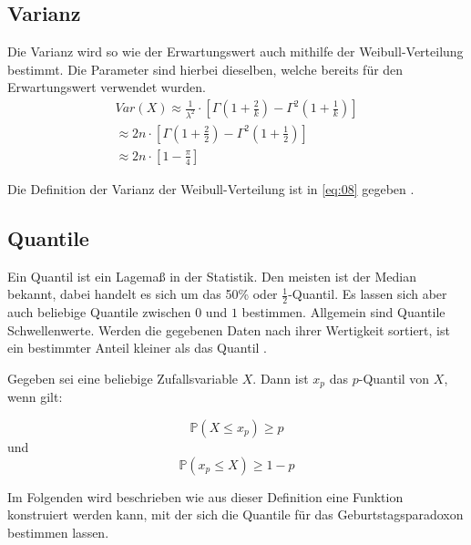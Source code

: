 \documentclass[../main.tex]{subfiles}
\begin{document}
\begin{flushleft}
        \subsection{Varianz}

        Die Varianz wird so wie der Erwartungswert auch mithilfe der Weibull-Verteilung bestimmt. Die Parameter sind hierbei dieselben, welche bereits für den Erwartungswert verwendet wurden\cite{rinne}.
        \begin{eqnarray}
            Var(X) \approx \frac{ 1 }{ \lambda^{ 2 } } \cdot [\Gamma (1+\frac{ 2 }{ k }) - \Gamma^{ 2 }(1+\frac{ 1 }{ k } )]   \label{eq:08}\\
            \approx 2n \cdot [\Gamma(1+\frac{ 2 }{ 2 }) - \Gamma^{ 2 }(1+\frac{ 1 }{ 2 } )] \\
            \approx 2n \cdot [1 - \frac{ \pi }{ 4 }]
        \end{eqnarray}

        Die Definition der Varianz der Weibull-Verteilung ist in \ref{eq:08} gegeben \cite{rinne}.

        \subsection{Quantile}\label{subsec:quantile}

        Ein Quantil ist ein Lagemaß in der Statistik. Den meisten ist der Median bekannt, dabei handelt es sich um das 50\% oder $\frac{1}{2}$-Quantil. Es lassen sich aber auch beliebige Quantile zwischen $0$ und $1$ bestimmen. Allgemein sind Quantile Schwellenwerte. Werden die gegebenen Daten nach ihrer Wertigkeit sortiert, ist ein bestimmter Anteil kleiner als das Quantil \cite[32,35,37]{henze}. \newline

        Gegeben sei eine beliebige Zufallsvariable $X$. Dann ist $x_{p}$ das $p$-Quantil von $X$, wenn gilt:

        \begin{equation}
            \mathbb{P}(X \leq x_p) \geq p
        \end{equation}
        und
        \begin{equation}
            \mathbb{P}( x_p \leq X ) \geq 1- p
        \end{equation}

        Im Folgenden wird beschrieben wie aus dieser Definition eine Funktion konstruiert werden kann, mit der sich die Quantile für das Geburtstagsparadoxon bestimmen lassen. \newline


\end{flushleft}
\end{document}
